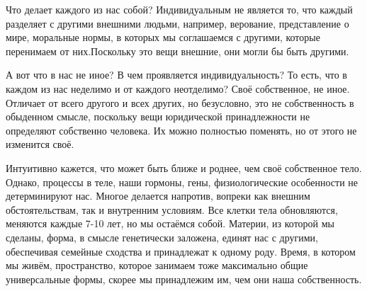 

Что делает
каждого из нас собой? Индивидуальным не является то, что каждый разделяет с другими
внешними людьми, например, верование, представление о мире, моральные нормы, в
которых мы соглашаемся с другими, которые перенимаем от них.Поскольку это вещи
внешние, они могли бы быть другими. 

А вот что в нас не иное? В чем проявляется
индивидуальность? То есть, что в каждом из нас неделимо и от каждого неотделимо?
Своё собственное, не иное. Отличает от всего другого и всех других, но
безусловно, это не собственность в обыденном смысле, поскольку вещи юридической
принадлежности не определяют собственно человека. Их можно полностью поменять,
но от этого не изменится своё. 

Интуитивно кажется, что может быть ближе и
роднее, чем своё собственное тело. Однако, процессы в теле, наши гормоны, гены,
физиологические особенности не детерминируют нас. Многое делается напротив,
вопреки как внешним обстоятельствам, так и внутренним условиям. Все клетки тела
обновляются, меняются каждые 7-10 лет, но мы остаёмся собой. Материи, из которой
мы сделаны, форма, в смысле генетически заложена, единят нас с другими,
обеспечивая семейные сходства и принадлежат к одному роду. Время, в котором мы
живём, пространство, которое занимаем тоже максимально общие универсальные
формы, скорее мы принадлежим им, чем они наша собственность. 

